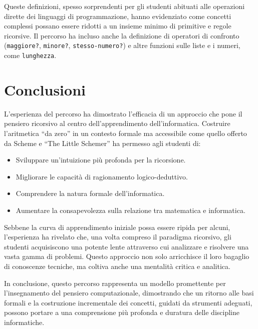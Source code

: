 \documentclass[withtimes]{easychair}
\begin{document}
Queste definizioni, spesso sorprendenti per gli studenti abituati alle operazioni dirette dei linguaggi di programmazione, hanno evidenziato
come concetti complessi possano essere ridotti a un insieme minimo di primitive e regole ricorsive. Il percorso ha incluso anche la definizione di operatori di confronto (\texttt{maggiore?}, \texttt{minore?}, \texttt{stesso-numero?}) e altre funzioni sulle liste e i numeri, come \texttt{lunghezza}.

\section{Conclusioni}\label{conclusioni}

L'esperienza del percorso ha dimostrato l'efficacia di un approccio che pone il pensiero ricorsivo al centro dell'apprendimento dell'informatica. Costruire l'aritmetica ``da zero'' in un contesto formale ma accessibile come quello offerto da Scheme e ``The Little Schemer'' ha permesso agli studenti di:

\begin{itemize}
\item   Sviluppare un'intuizione più profonda per la ricorsione. %
\item   Migliorare le capacità di ragionamento logico-deduttivo. %
\item   Comprendere la natura formale dell'informatica. %
\item  Aumentare la consapevolezza sulla relazione tra matematica e informatica. %
\end{itemize}

Sebbene la curva di apprendimento iniziale possa essere ripida per alcuni, l'esperienza ha rivelato che, una volta compreso il paradigma ricorsivo, gli studenti acquisiscono una potente lente attraverso cui analizzare e risolvere una vasta gamma di problemi. Questo approccio non solo arricchisce il loro bagaglio di conoscenze tecniche, ma coltiva
anche una mentalità critica e analitica.%

In conclusione, questo percorso rappresenta un modello promettente per l'insegnamento del pensiero computazionale, dimostrando che un ritorno alle basi formali e la costruzione incrementale dei concetti, guidati da strumenti adeguati, possono portare a una comprensione più profonda e duratura delle discipline informatiche.

\label{sect:bib}
\printbibliography
\end{document}
